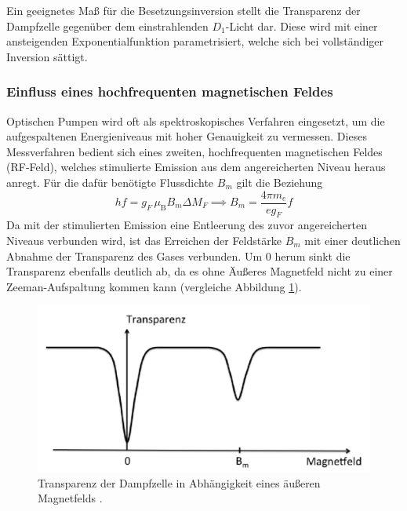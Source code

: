 \noindent Ein geeignetes Maß für die Besetzungsinversion stellt die Transparenz der Dampfzelle gegenüber dem einstrahlenden $D_1$-Licht dar. Diese wird mit einer ansteigenden Exponentialfunktion parametrisiert, welche sich bei vollständiger Inversion sättigt.\\

\subsubsection{Einfluss eines hochfrequenten magnetischen Feldes}
Optischen Pumpen wird oft als spektroskopisches Verfahren eingesetzt, um die aufgespaltenen Energieniveaus mit hoher Genauigkeit zu vermessen. Dieses Messverfahren bedient sich eines zweiten, hochfrequenten magnetischen Feldes (RF-Feld), welches stimulierte Emission aus dem angereicherten Niveau heraus anregt. Für die dafür benötigte Flussdichte $B_m$ gilt die Beziehung
\begin{equation}
h f = g_F \, \mu_{\text{B}} B_m \Delta M_F \implies B_m = \frac{4 \pi m_e}{e g_F} f
\label{eqn:B_M_Theorie}
\end{equation}
Da mit der stimulierten Emission eine Entleerung des zuvor angereicherten Niveaus verbunden wird, ist das Erreichen der Feldstärke $B_m$ mit einer deutlichen Abnahme der Transparenz des Gases verbunden. %
Um 0 herum sinkt die Transparenz ebenfalls deutlich ab, da es ohne Äußeres Magnetfeld nicht zu einer Zeeman-Aufspaltung kommen kann (vergleiche Abbildung \ref{fig:transparenz}). %

\begin{figure}
    \centering
    \includegraphics[width=\textwidth-120pt,keepaspectratio]{content/images/transparenz.png}
  	\caption{Transparenz der Dampfzelle in Abhängigkeit eines äußeren Magnetfelds \cite{V21}.}
    \label{fig:transparenz}
\end{figure}


